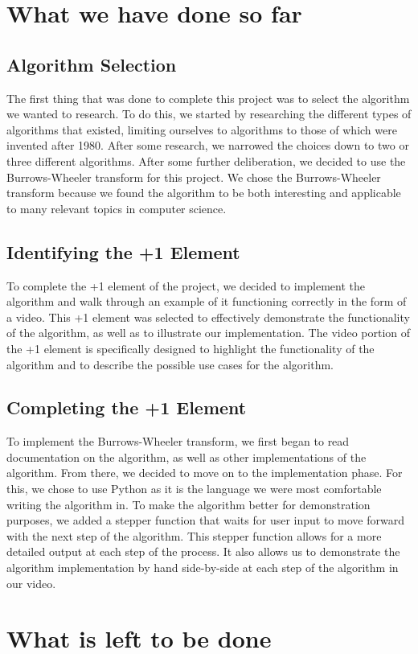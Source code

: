 \documentclass{article}
\begin{document}
   \section{What we have done so far}
   \subsection{Algorithm Selection}
   The first thing that was done to complete this project was to select the algorithm we wanted to research. To do this, we started by researching the different types of algorithms that existed, limiting ourselves to algorithms to those of which were invented after 1980. After some research, we narrowed the choices down to two or three different algorithms. After some further deliberation, we decided to use the Burrows-Wheeler transform for this project. We chose the Burrows-Wheeler transform because we found the algorithm to be both interesting and applicable to many relevant topics in computer science.
   
   \subsection{Identifying the +1 Element}
   To complete the +1 element of the project, we decided to implement the algorithm and walk through an example of it functioning correctly in the form of a video. This +1 element was selected to effectively demonstrate the functionality of the algorithm, as well as to illustrate our implementation. The video portion of the +1 element is specifically designed to highlight the functionality of the algorithm and to describe the possible use cases for the algorithm.
   
   \subsection{Completing the +1 Element}
   To implement the Burrows-Wheeler transform, we first began to read documentation on the algorithm, as well as other implementations of the algorithm. From there, we decided to move on to the implementation phase. For this, we chose to use Python as it is the language we were most comfortable writing the algorithm in. To make the algorithm better for demonstration purposes, we added a stepper function that waits for user input to move forward with the next step of the algorithm. This stepper function allows for a more detailed output at each step of the process. It also allows us to demonstrate the algorithm implementation by hand side-by-side at each step of the algorithm in our video.
   \section{What is left to be done}
\end{document}
